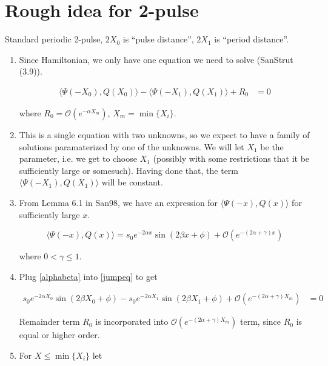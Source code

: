 \documentclass[12pt]{article}
\begin{document}
\section{Rough idea for 2-pulse}

Standard periodic 2-pulse, $2X_0$ is ``pulse distance'', $2X_1$ is ``period distance''.

\begin{enumerate}

\item Since Hamiltonian, we only have one equation we need to solve (SanStrut (3.9)).

\begin{align}\label{jumpeq}
\langle \Psi(-X_0), Q(X_0) \rangle - \langle \Psi(-X_1), Q(X_1) \rangle + R_0 &= 0
\end{align}

where $R_0 = \mathcal{O}(e^{-\alpha X_m})$, $X_m = \min\{X_i\}$.

\item This is a single equation with two unknowns, so we expect to have a family of solutions paramaterized by one of the unknowns. We will let $X_1$ be the parameter, i.e. we get to choose $X_1$ (possibly with some restrictions that it be sufficiently large or somesuch). Having done that, the term $\langle \Psi(-X_1), Q(X_1) \rangle$ will be constant.

\item From Lemma 6.1 in San98, we have an expression for $\langle \Psi(-x), Q(x) \rangle$ for sufficiently large $x$.

\begin{equation}\label{alphabeta}
\langle \Psi(-x), Q(x) \rangle
= s_0 e^{-2 \alpha x} \sin(2 \beta x + \phi) + \mathcal{O}(e^{-(2 \alpha + \gamma) x})
\end{equation}

where $0 < \gamma \leq 1$.

\item Plug \eqref{alphabeta} into \eqref{jumpeq} to get

\begin{align}\label{jumpeqnew}
s_0 e^{-2 \alpha X_0} \sin(2 \beta X_0 + \phi) - s_0 e^{-2 \alpha X_1} \sin(2 \beta X_1 + \phi) + \mathcal{O}(e^{-(2 \alpha + \gamma) X_m}) &= 0
\end{align}

Remainder term $R_0$ is incorporated into $\mathcal{O}(e^{-(2 \alpha + \gamma) X_m})$ term, since $R_0$ is equal or higher order.

\item For $X \leq \min\{ X_i \}$ let


\end{enumerate}
\end{document}
